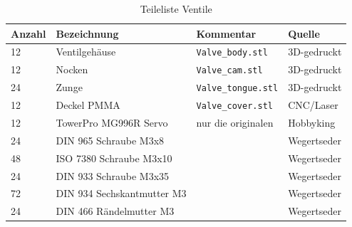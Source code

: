 \documentclass[a4paper]{scrartcl}
\begin{document}
\begin{table}
\caption{Teileliste Ventile}
\begin{tabular}{|l|l|l|l|}
\hline
Anzahl & Bezeichnung & Kommentar & Quelle\\
\hline
12 & Ventilgehäuse & \texttt{Valve\_body.stl} & 3D-gedruckt \\
\hline 
12 & Nocken & \texttt{Valve\_cam.stl} & 3D-gedruckt\\
\hline
24 & Zunge & \texttt{Valve\_tongue.stl} & 3D-gedruckt\\
\hline
12 & Deckel PMMA & \texttt{Valve\_cover.stl} & CNC/Laser \\
\hline 
12 & TowerPro MG996R Servo & nur die originalen & Hobbyking\\
\hline 
24 & DIN 965 Schraube M3x8 & & Wegertseder\\
\hline
48 & ISO 7380 Schraube M3x10 &  & Wegertseder\\
\hline
24 & DIN 933 Schraube M3x35 &  & Wegertseder\\
\hline
72 & DIN 934 Sechskantmutter M3 & & Wegertseder\\
\hline 
24 & DIN 466 Rändelmutter M3 &  & Wegertseder\\
\hline 

\end{tabular}
\end{table}
\end{document}
